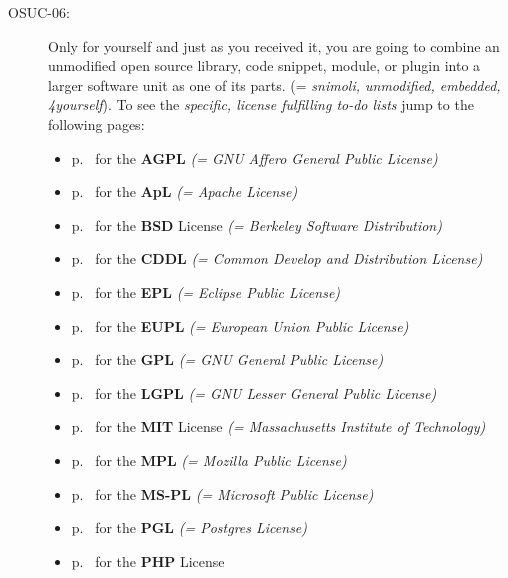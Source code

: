 \begin{description}
\item[OSUC-06:]\label{OSUC-06-DEF} Only for yourself and just as you received
it, you are going to combine an unmodified open source library, code snippet,
module, or plugin into a larger software unit as one of its parts. (=
\textit{snimoli, unmodified, embedded, 4yourself}).
To see the \textit{specific, license fulfilling to-do lists} jump to the
following pages:
   \begin{itemize}
    \item p.\ \pageref{OSUC-06-AGPL} for the \textbf{AGPL}
      \textit{(= GNU Affero General Public License)} 
    \item p.\ \pageref{OSUC-06-Apache20} for the \textbf{ApL}
      \textit{(= Apache License)}
    \item p.\ \pageref{OSUC-06-BSD} for the \textbf{BSD} License
      \textit{(= Berkeley Software Distribution)}
    \item p.\ \pageref{OSUC-06-CDDL} for the \textbf{CDDL}
      \textit{(= Common Develop and Distribution License)}  
    \item p.\ \pageref{OSUC-06-EPL} for the \textbf{EPL}
      \textit{(= Eclipse Public License)}     
    \item p.\ \pageref{OSUC-06-EUPL} for the \textbf{EUPL}
      \textit{(= European Union Public License)} 
    \item p.\ \pageref{OSUC-06-GPL} for the \textbf{GPL}
       \textit{(= GNU General Public License)} 
    \item p.\ \pageref{OSUC-06-LGPL} for the \textbf{LGPL}
      \textit{(= GNU Lesser General Public License)}           
    \item p.\ \pageref{OSUC-06-MIT} for the \textbf{MIT} License
       \textit{(= Massachusetts Institute of Technology)} 
    \item p.\ \pageref{OSUC-06-MPL} for the \textbf{MPL}
      \textit{(= Mozilla Public License)}     
    \item p.\ \pageref{OSUC-06-MS-PL} for the \textbf{MS-PL}
      \textit{(= Microsoft Public License)} 
    \item p.\ \pageref{OSUC-06-PGL} for the \textbf{PGL}
      \textit{(= Postgres License)} 
    \item p.\ \pageref{OSUC-06-PHP} for the \textbf{PHP} License 
  \end{itemize}


\end{description}
